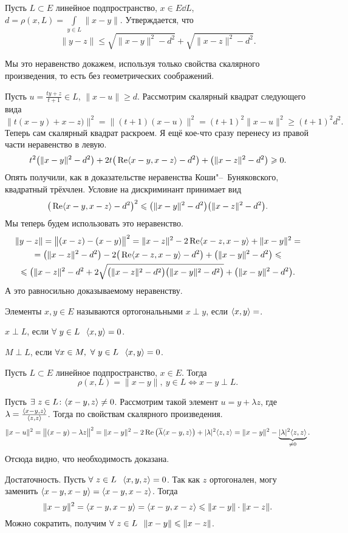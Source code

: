 \begin{Ut}
  Пусть $L\subset E$ линейное подпространство, $x\in E\dd L$, $d = \rho(x,L) = \int\limits_{y\in L}\|x-y\|$. Утверждается, что
\[
  \|y-z\|\le \sqrt{\|x-y\|^2 - d^2} + \sqrt{\|x-z\|^2-d^2}.
\]
\end{Ut}
Мы это неравенство докажем, используя только свойства скалярного произведения, то есть без геометрических соображений.

\begin{Proof}
  Пусть $u = \frac{ty+z}{t+1}\in L$, $\|x-u\|\ge d$. Рассмотрим скалярный квадрат следующего вида
\[
  \big\|t(x-y)+x-z)\big\|^2 = \big\|(t+1)(x-u)\big\|^2 = (t+1)^2\|x-u\|^2\ge (t+1)^2d^2.
\]
Теперь сам скалярный квадрат раскроем. Я ещё кое-что сразу перенесу из правой части неравенство в левую.
\[
  t^2\big(\|x-y\|^2-d^2\big)+2t\big(\mathop{\text{Re}}\langle x-y,x-z\rangle -d^2\big) + \big(\|x-z\|^2-d^2\big)\geqslant0.
\]
Опять получили, как в доказательстве неравенства Коши"--~Буняковского, квадратный трёхчлен. Условие на дискриминант принимает вид
\[
  \big(\mathop{\text{Re}}\langle x-y,x-z\rangle -d^2\big)^2\leqslant \big(\|x-y\|^2-d^2\big)\big(\|x-z\|^2-d^2\big).
\]
Мы теперь будем использовать это неравенство.
\begin{multline*}
  \|y-z\| = \big\|(x-z)-(x-y)\big\|^2 = \|x-z\|^2 - 2\mathop{\text{Re}}\langle x-z,x-y\rangle +\|x-y\|^2 =\\
   = \big(\|x-z\|^2-d^2\big) - 2\big(\mathop{\text{Re}}\langle x-z,x-y\rangle -d^2\big) + \big(\|x-y\|^2-d^2\big)\leqslant\\
  \leqslant \big(\|x-z\|^2-d^2+2\sqrt{\big(\|x-z\|^2-d^2\big)\big(\|x-y\|^2-d^2\big)} + \big(\|x-y\|^2-d^2\big).
\end{multline*}
А это равносильно доказываемому неравенству.
\end{Proof}

\begin{Def}
  Элементы $x,y\in E$ называются ортогональными $x\perp y$, если $\langle x,y\rangle =$.

  $x\perp L$, если $\forall\ y\in L\pau \la x,y\ra =0$.

  $M\perp L$, если $\forall x\in M,\ \forall\ y\in L\pau \la x,y\ra =0$.
\end{Def}

\begin{Lem}
  Пусть $L\subset E$ линейное подпространство, $x\in E$. Тогда
\[
  \rho(x,L) = \|x-y\|,\ y\in L\iff x-y\perp L.
\]
\end{Lem}
\begin{Proof}
  Пусть $\exists\ z\in L\colon \langle x-y,z\rangle \ne0$. Рассмотрим такой элемент $u = y+\lambda z$, где $\lambda = \frac{\langle x-y,z\rangle }{\langle z,z\rangle }$. Тогда по свойствам скалярного произведения.
\[
  \|x-u\|^2 = \big\|(x-y)-\lambda z\big\|^2 = \|x-y\|^2 - 2\mathop{\text{Re}}\big(\overline{\lambda}\langle x-y,z\rangle \big)+|\lambda|^2\langle z,z\rangle  =
  \|x-y\|^2-\underbrace{|\lambda|^2\langle z,z\rangle }_{\ne0}.
\]
Отсюда видно, что необходимость доказана.

Достаточность. Пусть $\forall\ z\in L\pau \la x,y,z\ra  = 0$.
Так как $z$ ортогонален, могу заменить $\langle x-y,x-y\rangle  = \langle x-y,x-z\rangle $. Тогда
\[
  \|x-y\|^2 = \langle x-y,x-y\rangle  = \langle x-y,x-z\rangle \leqslant \|x-y\|\cdot \|x-z\|.
\]
Можно сократить, получим $\forall\ z\in L\pau \|x-y\|\le \|x-z\|$.
\end{Proof}

